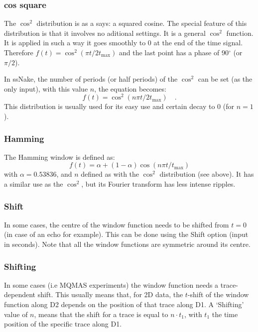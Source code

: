 \documentclass[11pt,a4paper]{article}
\begin{document}
\subsubsection{cos square}
The $\cos^2$ distribution is as a says: a squared cosine. The special feature of this distribution is that it
involves no aditional settings. It is a general $\cos^2$ function. It is applied in such a way it goes
smoothly to 0 at the end of the time signal. Therefore $f(t) = \cos^2(\pi t/2t_\text{max})$ and the
last point has a phase of 90$^\circ$ (or $\pi/2$). 

In ssNake, the number of periods (or half periods) of the $\cos^2$ can be set (as the only input), with this
value $n$, the equation becomes:
\begin{equation}
  f(t) = \cos^2(n\pi  t/2t_\text{max}) \quad .
\end{equation}
This distribution is usually used for its easy use and certain decay to 0 (for $n = 1$).


\subsubsection{Hamming}
The Hamming window is defined as:
\begin{equation}
  f(t) = \alpha + (1 - \alpha)\cos(n\pi t/t_\text{max})
\end{equation}
with $\alpha = 0.53836$, and $n$ defined as with the $\cos^2$ distribution (see above). It has a similar use
as the $\cos^2$, but its Fourier transform has less intense ripples.

\subsubsection{Shift}
In some cases, the centre of the window function needs to be shifted from $t = 0$ (in case of an echo for
example). This can be done using the
Shift option (input in seconds). Note that all the window functions are symmetric around its centre.

\subsubsection{Shifting}
In some cases (i.e MQMAS experiments) the window function needs a trace-dependent shift. This usually means
that, for 2D data, the $t$-shift of the window function along D2 depends on the position of that trace along
D1. A `Shifting' value of $n$, means that the shift for a trace is equal to $n \cdot t_1$, with $t_1$ the time
position of the specific trace along D1.
\end{document}
